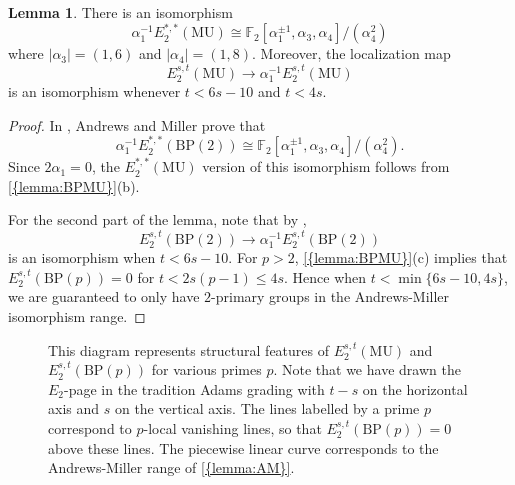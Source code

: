 \documentclass[10pt]{amsart}
\numberwithin{equation}{section}
\theoremstyle{plain}
\theoremstyle{definition}
\newtheorem{lemma}[lemma]{Lemma}
\theoremstyle{remark}
\begin{document}
\begin{lemma}\label{lemma:AM}
There is an isomorphism
\[
  \alpha_1^{-1}E_2^{*,*}({\mathrm{MU}})\cong {\mathbb{F}}_2[\alpha_1^{\pm 1},\alpha_3,\alpha_4]/(\alpha_4^2)
\]
where $|\alpha_3| = (1,6)$ and $|\alpha_4| = (1,8)$.  Moreover, the localization map \[E_2^{s,t}({\mathrm{MU}})\to \alpha_1^{-1}E_2^{s,t}({\mathrm{MU}})\] is an isomorphism whenever $t<6s-10$ and $t<4s$.
\end{lemma}
\begin{proof}
In \cite[Corollary 6.2.3]{AM}, Andrews and Miller prove that
\[
  \alpha_1^{-1}E_2^{*,*}({\mathrm{BP}}(2))\cong {\mathbb{F}}_2[\alpha_1^{\pm 1},\alpha_3,\alpha_4]/(\alpha_4^2).
\]
Since $2\alpha_1=0$, the $E_2^{*,*}({\mathrm{MU}})$ version of this isomorphism follows from {\autoref{{lemma:BPMU}}}(b).

For the second part of the lemma, note that by \cite[Proposition 5.1]{AM}, \[E_2^{s,t}({\mathrm{BP}}(2))\to \alpha_1^{-1}E_2^{s,t}({\mathrm{BP}}(2))\] is an isomorphism when $t<6s-10$.  For $p>2$, {\autoref{{lemma:BPMU}}}(c) implies that $E_2^{s,t}({\mathrm{BP}}(p)) = 0$ for $t<2s(p-1)\le 4s$.  Hence when $t<\min\{6s-10,4s\}$, we are guaranteed to only have $2$-primary groups in the Andrews-Miller isomorphism range.
\end{proof}

\begin{figure}
\begin{center}
\caption{This diagram represents structural features of $E_2^{s,t}({\mathrm{MU}})$ and $E_2^{s,t}({\mathrm{BP}}(p))$ for various primes $p$.  Note that we have drawn the $E_2$-page in the tradition Adams grading with $t-s$ on the horizontal axis and $s$ on the vertical axis.  The lines labelled by a prime $p$ correspond to $p$-local vanishing lines, so that $E_2^{s,t}({\mathrm{BP}}(p)) = 0$ above these lines.  The piecewise linear curve corresponds to the Andrews-Miller range of {\autoref{{lemma:AM}}}.}\label{fig:Novikov}
\end{center}
\end{figure}
\end{document}
